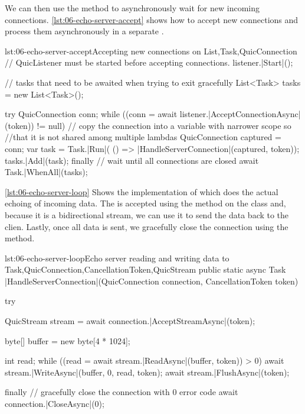 We can then use the  method to asynchronously wait for new incoming
connections. \autoref{lst:06-echo-server-accept} shows how to accept new connections and process
them asynchronously in a separate .

\begin{myListingCsharpNoPageBreak}{lst:06-echo-server-accept}{Accepting new connections on \QuicListener{}}{List,Task,QuicConnection}{}
    // QuicListener must be started before accepting connections.
    listener.|Start|();

    // tasks that need to be awaited when trying to exit gracefully
    List<Task> tasks = new List<Task>();

    try
    {
        QuicConnection conn;
        while ((conn = await listener.|AcceptConnectionAsync|(token)) != null)
        {
            // copy the connection into a variable with narrower scope so
            //that it is not shared among multiple lambdas
            QuicConnection captured = conn;
            var task = Task.|Run|(
                () => |HandleServerConnection|(captured, token));
            tasks.|Add|(task);
        }
    }
    finally
    {
        // wait until all connections are closed
        await Task.|WhenAll|(tasks);
    }
\end{myListingCsharpNoPageBreak}

\autoref{lst:06-echo-server-loop} Shows the implementation of  which
does the actual echoing of incoming data. The \QuicStream{} is accepted using the
 method on the \QuicConnection{} class and, because it is a bidirectional
stream, we can use it to send the data back to the clien. Lastly, once all data is sent, we
gracefully close the connection using the  method.

\begin{myListingCsharp}{lst:06-echo-server-loop}{Echo server reading and writing data to \QuicStream{}}{Task,QuicConnection,CancellationToken,QuicStream}{}
public static async Task |HandleServerConnection|(QuicConnection connection,
    CancellationToken token)
{
    try
    {
        QuicStream stream = await connection.|AcceptStreamAsync|(token);

        byte[] buffer = new byte[4 * 1024];

        int read;
        while ((read = await stream.|ReadAsync|(buffer, token)) > 0)
        {
            await stream.|WriteAsync|(buffer, 0, read, token);
            await stream.|FlushAsync|(token);
        }
    }
    finally
    {
        // gracefully close the connection with 0 error code
        await connection.|CloseAsync|(0);
    }
}
\end{myListingCsharp}

